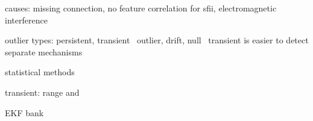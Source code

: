 causes: missing connection, no feature correlation for sfii, electromagnetic interference

outlier types: persistent, transient~\cite[p.~170~ff.]{Himmelblau.1994}
outlier, drift, null~\cite[p.~19 f.]{Kabzan.13.05.2019}
transient is easier to detect
separate mechanisms

statistical methods

transient: range and

EKF bank